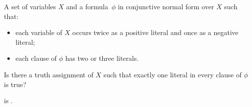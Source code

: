 
{
A set of variables $X$ and a formula~$\phi$ in conjunctive normal form over $X$ such that:
\begin{itemize}
    \item each variable of $X$ occurs twice as a positive literal and once as a negative literal;
    \item each clause of $\phi$ has two or three literals.
\end{itemize}
}
{
Is there a truth assignment of $X$ such that exactly one literal in every clause of $\phi$ is true?
}

\begin{lemma}
\label{thm:2-1-xsat}
    \rXthreeSAT{} is \classNPC{}.
\end{lemma}

